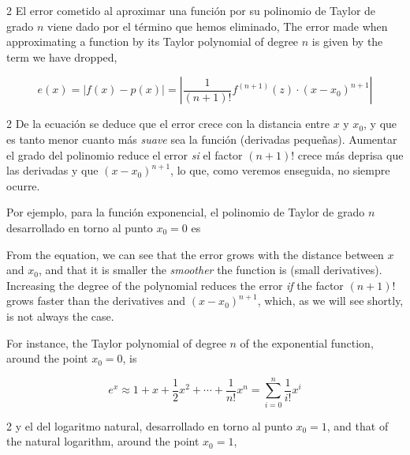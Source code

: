 \begin{paracol}{2}
El error cometido al aproximar una función por su polinomio de Taylor de grado $n$ viene dado por el término que hemos eliminado,
\switchcolumn
The error made when approximating a function by its Taylor polynomial of degree $n$ is given by the term we have dropped,
\end{paracol}
\begin{equation*}
e(x)=\lvert f(x) -p(x)\rvert=\left\lvert\frac{1}{(n+1)!} f^{(n+1)}(z)\cdot (x-x_0)^{n+1}\right\rvert
\end{equation*}
\begin{paracol}{2}
De la ecuación se deduce que el error crece con la distancia entre $x$ y $x_0$, y que es tanto menor cuanto más \emph{suave} sea la función (derivadas pequeñas). Aumentar el grado del polinomio reduce el error \emph{si} el factor $(n+1)!$ crece más deprisa que las derivadas y que $(x-x_0)^{n+1}$, lo que, como veremos enseguida, no siempre ocurre.

Por ejemplo, para la función exponencial, el polinomio de Taylor de grado $n$ desarrollado en torno al punto $x_0=0$ es 

\switchcolumn
From the equation, we can see that the error grows with the distance between $x$ and $x_0$, and that it is smaller the \emph{smoother} the function is (small derivatives). Increasing the degree of the polynomial reduces the error \emph{if} the factor $(n+1)!$ grows faster than the derivatives and $(x-x_0)^{n+1}$, which, as we will see shortly, is not always the case.

For instance, the Taylor polynomial of degree $n$ of the exponential function, around the point $x_0=0$, is 
\end{paracol}
\begin{equation*}
e^x\approx 1+x+\frac{1}{2}x^2+\cdots+\frac{1}{n!}x^n=\sum_{i=0}^n\frac{1}{i!}x^i
\end{equation*}
\begin{paracol}{2}
y el del logaritmo natural, desarrollado en torno al punto $x_0=1$, 
\switchcolumn
and that of the natural logarithm, around the point $x_0=1$, 
\end{paracol}

